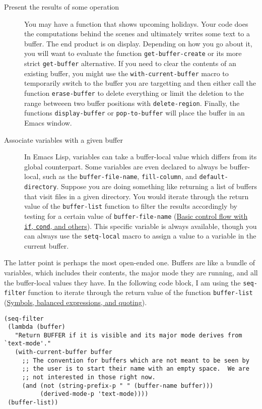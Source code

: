 \documentclass[11pt]{ctexart}
\begin{document}
\begin{description}
\item[{Present the results of some operation}] You may have a function that shows upcoming holidays. Your code does the computations behind the scenes and ultimately writes some text to a buffer. The end product is on display. Depending on how you go about it, you will want to evaluate the function \texttt{get-buffer-create} or its more strict \texttt{get-buffer} alternative. If you need to clear the contents of an existing buffer, you might use the \texttt{with-current-buffer} macro to temporarily switch to the buffer you are targetting and then either call the function \texttt{erase-buffer} to delete everything or limit the deletion to the range betweeen two buffer positions with \texttt{delete-region}. Finally, the functions \texttt{display-buffer} or \texttt{pop-to-buffer} will place the buffer in an Emacs window.
\end{description}

\begin{description}
\item[{Associate variables with a given buffer}] In Emacs Lisp, variables can take a buffer-local value which differs from its global counterpart. Some variables are even declared to always be buffer-local, such as the \texttt{buffer-file-name}, \texttt{fill-column}, and \texttt{default-directory}. Suppose you are doing something like returning a list of buffers that visit files in a given directory. You would iterate through the return value of the \texttt{buffer-list} function to filter the results accordingly by testing for a certain value of \texttt{buffer-file-name} (\hyperref[sec:org9074f8f]{Basic control flow with \texttt{if}, \texttt{cond}, and others}). This specific variable is always available, though you can always use the \texttt{setq-local} macro to assign a value to a variable in the current buffer.
\end{description}

The latter point is perhaps the most open-ended one. Buffers are like a bundle of variables, which includes their contents, the major mode they are running, and all the buffer-local values they have. In the following code block, I am using the \texttt{seq-filter} function to iterate through the return value of the function \texttt{buffer-list} (\hyperref[sec:org9b7817a]{Symbols, balanced expressions, and quoting}).

\begin{verbatim}
(seq-filter
 (lambda (buffer)
   "Return BUFFER if it is visible and its major mode derives from `text-mode'."
   (with-current-buffer buffer
     ;; The convention for buffers which are not meant to be seen by
     ;; the user is to start their name with an empty space.  We are
     ;; not interested in those right now.
     (and (not (string-prefix-p " " (buffer-name buffer)))
          (derived-mode-p 'text-mode))))
 (buffer-list))
\end{verbatim}
\end{document}
